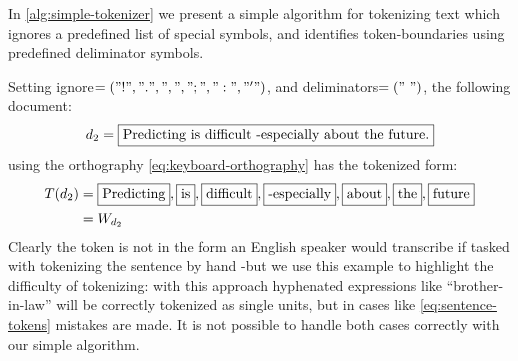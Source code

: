 \begin{example}\label{ex:simple-tokenizer}
  In \autoref{alg:simple-tokenizer} we present a simple algorithm for tokenizing text which ignores a predefined list of special symbols, and identifies token-boundaries using predefined deliminator symbols.

  Setting {\sffamily ignore}$=("!", ".", ",", ";", ":", "'")$, and {\sffamily deliminators}$=("~")$, the following document:
  \begin{equation*}
    d_2=\text{\fbox{Predicting is difficult -especially about the future.}}
  \end{equation*}
  using the orthography \eqref{eq:keyboard-orthography} has the tokenized form:
  \begin{align}
    T(d_2)&=\text{\fbox{Predicting}}, \text{\fbox{is\vphantom{gt}}}, \text{\fbox{difficult\vphantom{gt}}}, \text{\fbox{-especially\vphantom{gt}}}, \text{\fbox{about\vphantom{gt}}}, \text{\fbox{the\vphantom{gt}}}, \text{\fbox{future\vphantom{gt}}}\label{eq:sentence-tokens}\\
    &=W_{d_2}\nonumber
  \end{align}
  Clearly the token  is not in the form an English speaker would transcribe if tasked with tokenizing the sentence by hand -but we use this example to highlight the difficulty of tokenizing: with this approach hyphenated expressions like ``brother-in-law'' will be correctly tokenized as single units, but in cases like \eqref{eq:sentence-tokens} mistakes are made. It is not possible to handle both cases correctly with our simple algorithm.
\end{example}

